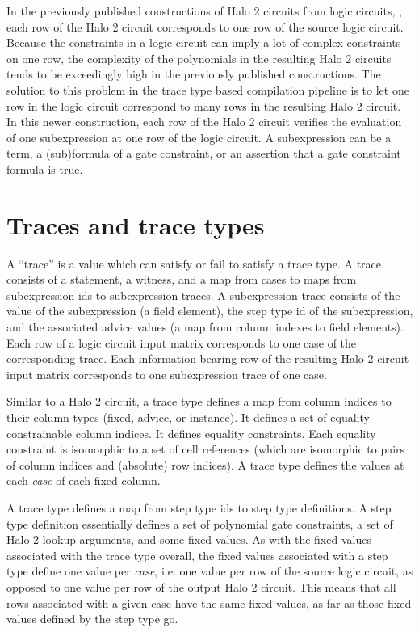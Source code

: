 \documentclass[11pt]{article}
\begin{document}
In the previously published constructions of Halo 2 circuits from logic circuits, \cite{sigma11,sigma11-poly-bounds}, each row of the Halo 2 circuit corresponds to one row of the source logic circuit. Because the constraints in a logic circuit can imply a lot of complex constraints on one row, the complexity of the polynomials in the resulting Halo 2 circuits tends to be exceedingly high in the previously published constructions. The solution to this problem in the trace type based compilation pipeline is to let one row in the logic circuit correspond to many rows in the resulting Halo 2 circuit. In this newer construction, each row of the Halo 2 circuit verifies the evaluation of one subexpression at one row of the logic circuit. A subexpression can be a term, a (sub)formula of a gate constraint, or an assertion that a gate constraint formula is true.

\section{Traces and trace types}
\label{sec:trace-types}

A ``trace'' is a value which can satisfy or fail to satisfy a trace type. A trace consists of a statement, a witness, and a map from cases to maps from subexpression ids to subexpression traces. A subexpression trace consists of the value of the subexpression (a field element), the step type id of the subexpression, and the associated advice values (a map from column indexes to field elements). Each row of a logic circuit input matrix corresponds to one case of the corresponding trace. Each information bearing row of the resulting Halo 2 circuit input matrix corresponds to one subexpression trace of one case.

Similar to a Halo 2 circuit, a trace type defines a map from column indices to their column types (fixed, advice, or instance). It defines a set of equality constrainable column indices. It defines equality constraints. Each equality constraint is isomorphic to a set of cell references (which are isomorphic to pairs of column indices and (absolute) row indices). A trace type defines the values at each \emph{case}\/ of each fixed column.

A trace type defines a map from step type ids to step type definitions. A step type definition essentially defines a set of polynomial gate constraints, a set of Halo 2 lookup arguments, and some fixed values. As with the fixed values associated with the trace type overall, the fixed values associated with a step type define one value per \emph{case}, i.e. one value per row of the source logic circuit, as opposed to one value per row of the output Halo 2 circuit. This means that all rows associated with a given case have the same fixed values, as far as those fixed values defined by the step type go.
\end{document}
